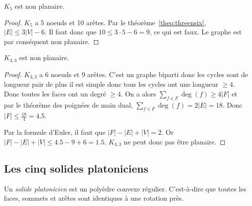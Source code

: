\begin{mycorr}
  $K_5$ est non planaire.
  \begin{proof}
    $K_5$ a 5 noeuds et 10 arêtes.
    Par le théorème~\ref{theo:threensix}, $|E| \leq 3|V| - 6$.
    Il faut donc que $10 \leq 3 \cdot 5 - 6 = 9$, ce qui est faux.
    Le graphe est par conséquent non planaire.
  \end{proof}
\end{mycorr}

\begin{mycorr}
  $K_{3,3}$ est non planaire.
  \begin{proof}
    $K_{3,3}$ a 6 noeuds et 9 arêtes.
    C'est un graphe biparti donc les cycles sont de longueur pair de plus il est simple donc tous les cycles ont une longueur $\geq 4$.
    Donc toutes les faces ont un degré $\geq 4$.
    On a alors $\sum_{f \in F} \deg(f) \geq 4|F|$ et par le théorème des poignées de main dual, $\sum_{f \in F} \deg(f) = 2|E| = 18$.
    Donc $|F| \leq \frac{18}{4} = 4.5$.

    Par la formule d'Euler, il faut que
    $|F| - |E| + |V| = 2$.
    Or $|F| - |E| + |V| \leq 4.5 - 9 + 6 = 1.5$.
    $K_{3,3}$ ne peut donc pas être planaire.
  \end{proof}
\end{mycorr}

\subsection{Les cinq solides platoniciens}
\begin{mydef}
  Un \emph{solide platonicien} est un polyèdre convexe régulier.
  C'est-à-dire que toutes les faces, sommets et arêtes sont identiques à une rotation près.
\end{mydef}

